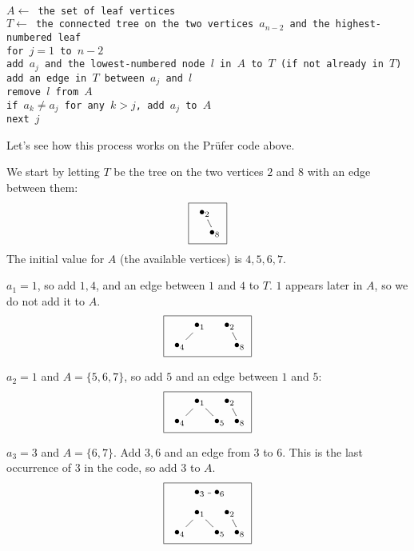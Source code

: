 \documentclass[12pt]{article}
\begin{document}
\texttt{
\\
\hspace*{6pt}$A\leftarrow$ the set of leaf vertices\\
\hspace*{6pt}$T\leftarrow$ the connected tree on the two vertices $a_{n-2}$ and the highest-numbered leaf\\
\hspace*{6pt}for $j=1$ to $n-2$\\
\hspace*{18pt}add $a_j$ and the lowest-numbered node $l$ in $A$ to $T$ (if not already in $T$)\\
\hspace*{18pt}add an edge in $T$ between $a_j$ and $l$\\
\hspace*{18pt}remove $l$ from $A$\\
\hspace*{18pt}if $a_k\neq a_j$ for any $k>j$, add $a_j$ to $A$\\
\hspace*{6pt}next $j$
}

Let's see how this process works on the Pr\"ufer code above.

We start by letting $T$ be the tree on the two vertices $2$ and $8$ with an edge between them:
\[ \fbox{ \xygraph{
!{(1.25,.5)   }*+{\bullet_{2}}="2"
!{(1.5,0) }*+{\bullet_{8}}="8"
"2"-"8"
} } \]
The initial value for $A$ (the available vertices) is $4,5,6,7$.

$a_1=1$, so add $1, 4$, and an edge between $1$ and $4$ to $T$. $1$ appears later in $A$, so we do not add it to $A$.
\[ \fbox{ \xygraph{
!{(0,0)   }*+{\bullet_{4}}="4"
!{(0.5,0.5) }*+{\bullet_{1}}="1"
!{(1.25,.5)   }*+{\bullet_{2}}="2"
!{(1.5,0) }*+{\bullet_{8}}="8"
"1"-"4" "2"-"8"
} } \]

$a_2=1$ and $A=\{5,6,7\}$, so add $5$ and an edge between $1$ and $5$:
\[ \fbox{ \xygraph{
!{(0,0)   }*+{\bullet_{4}}="4"
!{(0.5,0.5) }*+{\bullet_{1}}="1"
!{(1.25,.5)   }*+{\bullet_{2}}="2"
!{(1,0)   }*+{\bullet_{5}}="5"
!{(1.5,0) }*+{\bullet_{8}}="8"
"1"-"4" "1"-"5"
"2"-"8"
} } \]

$a_3=3$ and $A=\{6,7\}$. Add $3, 6$ and an edge from $3$ to $6$. This is the last occurrence of $3$ in the code, so add $3$ to $A$.
\[ \fbox{ \xygraph{
!{(0,0)   }*+{\bullet_{4}}="4"
!{(0.5,0.5) }*+{\bullet_{1}}="1"
!{(0.5,1) }*+{\bullet_{3}}="3"
!{(1,1)   }*+{\bullet_{6}}="6"
!{(1.25,.5)   }*+{\bullet_{2}}="2"
!{(1,0)   }*+{\bullet_{5}}="5"
!{(1.5,0) }*+{\bullet_{8}}="8"
"1"-"4" "1"-"5"
"3"-"6"
"2"-"8"
} } \]
\end{document}
